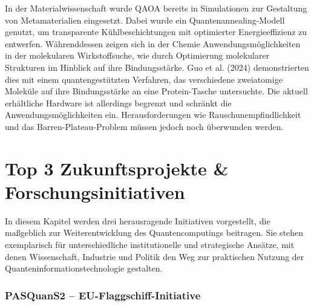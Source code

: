In der Materialwissenschaft wurde QAOA bereits in Simulationen zur Gestaltung von Metamaterialien eingesetzt. Dabei wurde ein Quantenannealing-Modell genutzt, um transparente Kühlbeschichtungen mit optimierter Energieeffizienz zu entwerfen. \citealp[18]{guoHarnessingQuantumPower2024} Währenddessen zeigen sich in der Chemie Anwendungsmöglichkeiten in der molekularen Wirkstoffsuche, wie durch Optimierung molekularer Strukturen im Hinblick auf ihre Bindungsstärke. Guo et al. (2024) demonstrierten dies mit einem quantengestützten Verfahren, das verschiedene zweiatomige Moleküle auf ihre Bindungsstärke an eine Protein-Tasche untersuchte. Die aktuell erhältliche Hardware ist allerdings begrenzt und schränkt die Anwendungsmöglichkeiten ein. Herausforderungen wie Rauschunempfindlichkeit und das Barren-Plateau-Problem müssen jedoch noch überwunden werden. \citealp[12]{weidmanQuantumComputingChemistry2024a}


\section{Top 3 Zukunftsprojekte \& Forschungsinitiativen}

In diesem Kapitel werden drei herausragende Initiativen vorgestellt, die maßgeblich zur Weiterentwicklung des Quantencomputings beitragen. Sie stehen exemplarisch für unterschiedliche institutionelle und strategische Ansätze, mit denen Wissenschaft, Industrie und Politik den Weg zur praktischen Nutzung der Quanteninformationstechnologie gestalten. 

\subsubsection*{PASQuanS2 – EU-Flaggschiff-Initiative}


